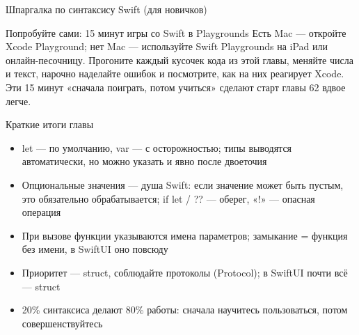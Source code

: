 \begin{center}\small\color{gray}Шпаргалка по синтаксису Swift (для новичков)\end{center}

\begin{tcbpractice}{Попробуйте сами: 15 минут игры со Swift в Playgrounds}
Есть Mac — откройте Xcode Playground; нет Mac — используйте Swift Playgrounds на iPad или онлайн-песочницу. Прогоните каждый кусочек кода из этой главы, меняйте числа и текст, нарочно наделайте ошибок и посмотрите, как на них реагирует Xcode. Эти 15 минут «сначала поиграть, потом учиться» сделают старт главы 62 вдвое легче.

\end{tcbpractice}

\begin{tcbsummary}{Краткие итоги главы}
\begin{itemize}
  \item let — по умолчанию, var — с осторожностью; типы выводятся автоматически, но можно указать и явно после двоеточия
  \item Опциональные значения — душа Swift: если значение может быть пустым, это обязательно обрабатывается; if let / ?? — оберег, «!» — опасная операция
  \item При вызове функции указываются имена параметров; замыкание = функция без имени, в SwiftUI оно повсюду
  \item Приоритет — struct, соблюдайте протоколы (Protocol); в SwiftUI почти всё — struct
  \item 20\% синтаксиса делают 80\% работы: сначала научитесь пользоваться, потом совершенствуйтесь
\end{itemize}

\end{tcbsummary}
